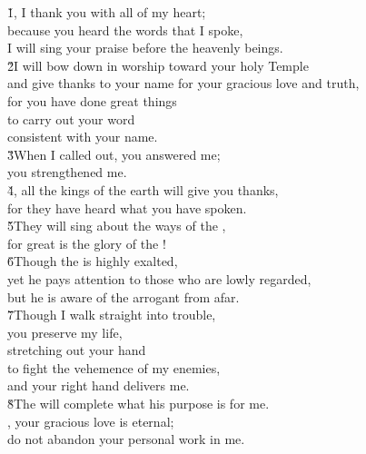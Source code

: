 \begin{poetry}
\poeml \v{1}, I thank you with all of my heart; \\
\poemll    because you heard the words that I spoke, \\
\poemlll       I will sing your praise before the heavenly beings. \\
\poeml \v{2}I will bow down in worship toward your holy Temple \\
\poemll    and give thanks to your name for your gracious love and truth, \\
\poeml for you have done great things \\
\poemll    to carry out your word \\
\poemlll       consistent with your name. \\
\poeml \v{3}When I called out, you answered me; \\
\poemll    you strengthened me. \\
\poeml \v{4}, all the kings of the earth will give you thanks, \\
\poemll    for they have heard what you have spoken. \\
\poeml \v{5}They will sing about the ways of the , \\
\poemll    for great is the glory of the ! \\
\poeml \v{6}Though the  is highly exalted, \\
\poemll    yet he pays attention to those who are lowly regarded, \\
\poemlll       but he is aware of the arrogant from afar. \\
\poeml \v{7}Though I walk straight into trouble, \\
\poemll    you preserve my life, \\
\poeml stretching out your hand \\
\poemll    to fight the vehemence of my enemies, \\
\poemlll       and your right hand delivers me. \\
\poeml \v{8}The  will complete what his purpose is for me. \\
\poemll    {}, your gracious love is eternal; \\
\poemlll       do not abandon your personal work in me.
\end{poetry}

